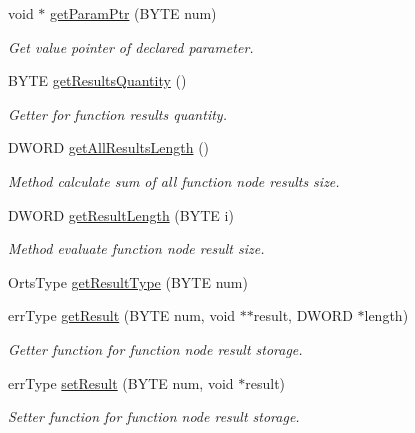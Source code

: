 \begin{DoxyCompactItemize}
void $\ast$ \hyperlink{classfunctionNode_ab5daebf8b35c9d765928aec4cf4f8293}{getParamPtr} (BYTE num)
\begin{DoxyCompactList}\small\item\em Get value pointer of declared parameter. \item\end{DoxyCompactList}\item 
BYTE \hyperlink{classfunctionNode_a28711f236d1479be526f51d0cef88fc1}{getResultsQuantity} ()
\begin{DoxyCompactList}\small\item\em Getter for function results quantity. \item\end{DoxyCompactList}\item 
DWORD \hyperlink{classfunctionNode_a265f925c43771fe27ca10d1dc2258ac9}{getAllResultsLength} ()
\begin{DoxyCompactList}\small\item\em Method calculate sum of all function node results size. \item\end{DoxyCompactList}\item 
DWORD \hyperlink{classfunctionNode_a428cf02081ee4572275ade6dd0048d9d}{getResultLength} (BYTE i)
\begin{DoxyCompactList}\small\item\em Method evaluate function node result size. \item\end{DoxyCompactList}\item 
OrtsType \hyperlink{classfunctionNode_a00fd6bca048b8ae3fb250b068d686c6c}{getResultType} (BYTE num)
\item 
errType \hyperlink{classfunctionNode_a4aeab76fce67c17e3cf2545d9f5a4364}{getResult} (BYTE num, void $\ast$$\ast$result, DWORD $\ast$length)
\begin{DoxyCompactList}\small\item\em Getter function for function node result storage. \item\end{DoxyCompactList}\item 
errType \hyperlink{classfunctionNode_ae4a99750e54a8a2cac39db384903a092}{setResult} (BYTE num, void $\ast$result)
\begin{DoxyCompactList}\small\item\em Setter function for function node result storage. \item\end{DoxyCompactList}\item 
$$
\end{DoxyCompactItemize}
